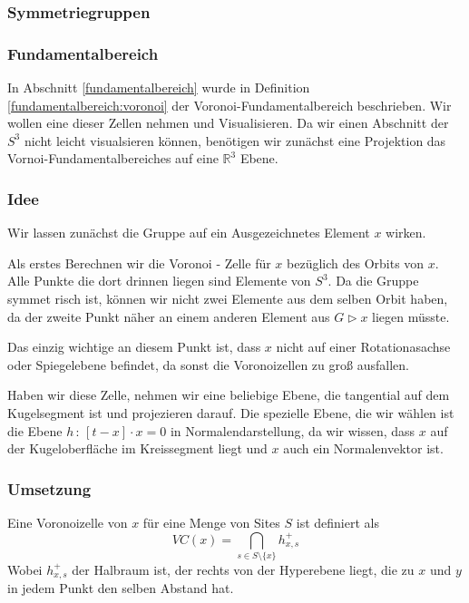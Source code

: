     \subsubsection{Symmetriegruppen}
    \subsubsection{Fundamentalbereich}
         In Abschnitt \ref{fundamentalbereich} wurde in Definition \ref{fundamentalbereich:voronoi} der Voronoi-Fundamentalbereich beschrieben. Wir wollen eine dieser Zellen
         nehmen und Visualisieren. Da wir einen Abschnitt der $S^3$ nicht leicht visualsieren können, benötigen wir zunächst eine Projektion das Vornoi-Fundamentalbereiches auf
         eine $\mathbb{R}^3$ Ebene.
        \subsubsection*{Idee}
            Wir lassen zunächst die Gruppe auf ein Ausgezeichnetes Element $x$ wirken.

            Als erstes Berechnen wir die Voronoi - Zelle für $x$ bezüglich des Orbits von $x$. Alle Punkte die dort drinnen liegen sind Elemente von $S^3$. Da die Gruppe symmet          risch ist, können wir nicht zwei Elemente aus dem selben Orbit haben, da der zweite Punkt näher an einem anderen Element aus $G \rhd x$ liegen müsste.

         Das einzig wichtige an diesem Punkt ist, dass $x$ nicht auf einer Rotationasachse oder Spiegelebene befindet, da sonst die Voronoizellen zu groß ausfallen.

         Haben wir diese Zelle, nehmen wir eine beliebige Ebene, die tangential auf dem Kugelsegment ist und projezieren darauf. Die spezielle Ebene, die wir wählen
         ist die Ebene $h \, : \, [t - x] \cdot x = 0$ in Normalendarstellung, da wir wissen, dass $x$ auf der Kugeloberfläche im Kreissegment liegt und $x$ auch ein
          Normalenvektor ist.
            
        \subsubsection*{Umsetzung}
         Eine Voronoizelle von $x$ für eine Menge von Sites $S$ ist definiert als 
         $$ VC(x) = \bigcap_{s \in S \setminus \{ x \}} h^+_{x,s}$$
         Wobei $h^+_{x,s}$ der Halbraum ist, der rechts von der Hyperebene liegt, die zu $x$ und $y$ in jedem Punkt den selben Abstand hat.\\

